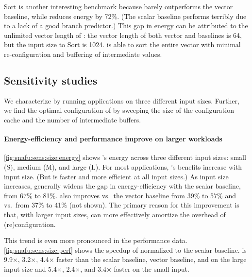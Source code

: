 Sort is another interesting benchmark because \manic barely outperforms the vector baseline, while \snafuarch reduces energy by 72\%.
(The scalar baseline performs terribly due to a lack of a good branch predictor.)
% 
This gap in energy can be attributed to the unlimited vector length of \snafuarch:
% 
the vector length of both vector and \manic baselines is 64, but the input size to Sort is 1024.
% 
\snafuarch is able to sort the entire vector with minimal re-configuration
and buffering of intermediate values.

\subsection{Sensitivity studies}
We characterize \snafuarch by running applications on three different input sizes. %
% 
Further, we find the optimal configuration of \snafuarch by sweeping the size of the configuration cache %
and the number of intermediate buffers. %


\paragraph{Energy-efficiency and performance improve on larger workloads}
\autoref{fig:snafu:sens:size:energy} shows \snafuarch's energy across three different input sizes: small (S), medium (M), and large (L). 
%
For most applications, \snafuarch's benefits increase with input size.
(But \snafuarch is faster and more efficient at all input sizes.)
%
As input size increases, \snafuarch generally widens the gap in energy-efficiency with the scalar baseline, from 67\% to 81\%.
%
\snafuarch also improves vs.\ the vector baseline from 39\% to 57\% and vs.\ \manic from 37\% to 41\% (not shown).
% 
The primary reason for this improvement is that, with larger input sizes, \snafuarch can more effectively amortize the overhead of (re)configuration.
% 

This trend is even more pronounced in the performance data.
% 
\autoref{fig:snafu:sens:size:perf} shows the speedup of \snafuarch normalized to the scalar baseline.
%
\snafuarch is 9.9$\times$, 3.2$\times$, 4.4$\times$ faster than the scalar baseline, vector baseline, and \manic on the large input size and 5.4$\times$, 2.4$\times$, and 3.4$\times$ faster on the small input.

